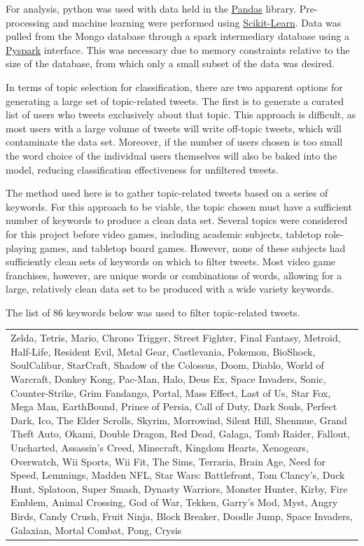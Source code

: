 \documentclass[11pt]{revtex4-1}
\begin{document}
For analysis, python was used with data held in the
\href{http://pandas.pydata.org/}{\sc Pandas} library.  Pre-processing
and machine learning were performed using
\href{http://scikit-learn.org/stable/}{\sc Scikit-Learn}.  Data was
pulled from the Mongo database through a spark intermediary database
using a
\href{http://spark.apache.org/docs/0.9.0/python-programming-guide.html}{\sc
  Pyspark} interface.  This was necessary due to memory constraints
relative to the size of the database, from which only a small subset
of the data was desired.

In terms of topic selection for classification, there are two apparent
options for generating a large set of topic-related tweets.  The first
is to generate a curated list of users who tweets exclusively about
that topic.  This approach is difficult, as most users with a large
volume of tweets will write off-topic tweets, which will contaminate
the data set.  Moreover, if the number of users chosen is too small
the word choice of the individual users themselves will also be baked
into the model, reducing classification effectiveness for unfiltered
tweets.

The method used here is to gather topic-related tweets based on a
series of keywords.  For this approach to be viable, the topic chosen
must have a sufficient number of keywords to produce a clean data set.
Several topics were considered for this project before video games,
including academic subjects, tabletop role-playing games, and tabletop
board games.  However, none of these subjects had sufficiently clean
sets of keywords on which to filter tweets.  Most video game
franchises, however, are unique words or combinations of words,
allowing for a large, relatively clean data set to be produced with a
wide variety keywords.

The list of 86 keywords below was used to filter topic-related tweets.

\begin{center}
\begin{tabular}{p{14cm}}
{\tiny Zelda, Tetris, Mario, Chrono Trigger, Street Fighter, Final
  Fantasy, Metroid, Half-Life, Resident Evil, Metal Gear, Castlevania,
  Pokemon, BioShock, SoulCalibur, StarCraft, Shadow of the Colossus,
  Doom, Diablo, World of Warcraft, Donkey Kong, Pac-Man, Halo, Deus
  Ex, Space Invaders, Sonic, Counter-Strike, Grim Fandango, Portal,
  Mass Effect, Last of Us, Star Fox, Mega Man, EarthBound, Prince of
  Persia, Call of Duty, Dark Souls, Perfect Dark, Ico, The Elder
  Scrolls, Skyrim, Morrowind, Silent Hill, Shenmue, Grand Theft Auto,
  Okami, Double Dragon, Red Dead, Galaga, Tomb Raider, Fallout,
  Uncharted, Assassin's Creed, Minecraft, Kingdom Hearts, Xenogears,
  Overwatch, Wii Sports, Wii Fit, The Sims, Terraria, Brain Age, Need
  for Speed, Lemmings, Madden NFL, Star Wars: Battlefront, Tom
  Clancy's, Duck Hunt, Splatoon, Super Smash, Dynasty Warriors,
  Monster Hunter, Kirby, Fire Emblem, Animal Crossing, God of War,
  Tekken, Garry's Mod, Myst, Angry Birds, Candy Crush, Fruit Ninja,
  Block Breaker, Doodle Jump, Space Invaders, Galaxian, Mortal Combat,
  Pong, Crysis}
\end{tabular}
\end{center}
\end{document}
